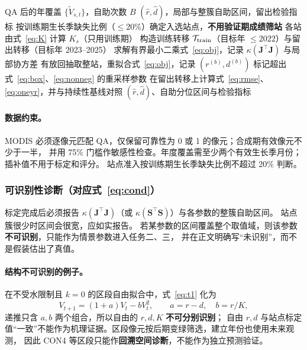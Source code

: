 \documentclass[11pt,a4paper]{ctexart}
\begin{document}
\begin{algorithm}[H]
\caption{任务一参数标定（一步转移合并最小二乘）}\label{alg:t1}
\begin{algorithmic}[1]
\Require QA 后的年覆盖 $\{\tilde V_{s,t}\}$，自助次数 $B$
\Ensure $(\hat r,\hat d)$，局部与整簇自助区间，留出检验指标
\State 按训练期生长季缺失比例（$\le20\%$）确定入选站点，\textbf{不用验证期成绩筛站}
\State 各站由式~\eqref{eq:K} 计算 $K_s$（只用训练期）
\State 构造训练转移 $\mathcal T_{\rm train}$（目标年 $\le2022$）与留出转移（目标年 2023--2025）
\State 求解有界最小二乘式~\eqref{eq:obj}，记录 $\kappa(\bm J^\top\bm J)$ 与局部协方差
  \State 有放回抽取整站，重拟合式~\eqref{eq:obj}，记录 $(r^{(b)},d^{(b)})$
\EndFor
\State 标记超出式~\eqref{eq:box}、\eqref{eq:nonneg} 的重采样参数
\State 在留出转移上计算式~\eqref{eq:rmse}、\eqref{eq:oneyr}，并与持续性基线对照
\State \Return $(\hat r,\hat d)$、自助分位区间与检验指标
\end{algorithmic}
\end{algorithm}

\paragraph{数据约束。}
MODIS 必须逐像元匹配 QA，仅保留可靠性为 0 或 1 的像元；合成期有效像元不少于一半，
并用 75\% 门槛作敏感性检查。年度覆盖需至少两个有效生长季月份；插补值不用于标定和评分。
站点准入按训练期生长季缺失比例不超过 20\% 判断。

\subsubsection{可识别性诊断（对应式~\eqref{eq:cond}）}\label{sec:diag}

标定完成后必须报告 $\kappa(\bm J^{\top}\bm J)$（或 $\kappa(\bm S^\top\bm S)$）与各参数的整簇自助区间。
站点簇很少时区间会很宽，应如实报告。
若某参数的区间覆盖整个取值域，则该参数\textbf{不可识别}，只能作为情景参数进入任务二、三，
并在正文明确写“未识别”，而不是假装估出了真值。

\paragraph{结构不可识别的例子。}
在不受水限制且 $k=0$ 的区段自由拟合中，式~\eqref{eq:t1} 化为
\begin{equation}\label{eq:ident}
V_{t+1}=(1+a)V_t-bV_t^2,\qquad a=r-d,\quad b=r/K,
\end{equation}
递推只含 $a,b$ 两个组合，所以自由的 $r,d,K$ \textbf{不可分别识别}；
自由 $r,d$ 与站点标定值“一致”不能作为机理证据。区段像元按后期变绿筛选，建立年份也使用未来观测，
因此 CON4 等区段只能作\textbf{回溯空间诊断}，不能作为独立预测验证。
\end{document}
